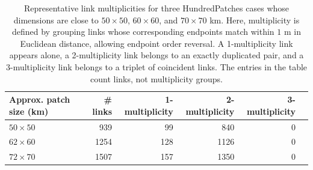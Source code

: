 \documentclass[11pt]{article}
\begin{document}

\begin{table}[H]
  \centering
  \begin{tabular}{lrrrrr}
    \toprule
    Approx. patch size (km) & \# links & 1-multiplicity & 2-multiplicity & 3-multiplicity \\
    \midrule
    $50 \times 50$ & 939 & 99 & 840 & 0 \\
    $62 \times 60$ & 1254 & 128 & 1126 & 0 \\
    $72 \times 70$ & 1507 & 157 & 1350 & 0 \\
    \bottomrule
  \end{tabular}
  \caption{Representative link multiplicities for three HundredPatches cases whose dimensions are close to $50\times 50$, $60\times 60$, and $70\times 70$ km. Here, multiplicity is defined by grouping links whose corresponding endpoints match within $1$ m in Euclidean distance, allowing endpoint order reversal. A 1-multiplicity link appears alone, a 2-multiplicity link belongs to an exactly duplicated pair, and a 3-multiplicity link belongs to a triplet of coincident links. The entries in the table count links, not multiplicity groups.}
\end{table}
\end{document}
